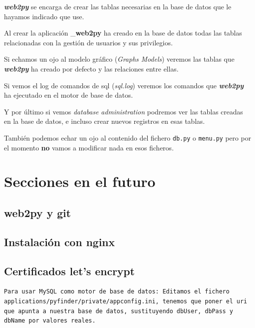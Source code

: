 \documentclass[
  12pt,
  spanish,
]{article}
\begin{document}
\textbf{\emph{web2py}} se encarga de crear las tablas necesarias en la
base de datos que le hayamos indicado que use.

Al crear la aplicación \_\textbf{web2py} ha creado en la base de datos
todas las tablas relacionadas con la gestión de usuarios y sus
privilegios.

Si echamos un ojo al modelo gráfico (\emph{Graphs Models}) veremos las
tablas que \textbf{\emph{web2py}} ha creado por defecto y las relaciones
entre ellas.

Si vemos el log de comandos de sql (\emph{sql.log}) veremos los comandos
que \textbf{\emph{web2py}} ha ejecutado en el motor de base de datos.

Y por último si vemos \emph{database administration} podremos ver las
tablas creadas en la base de datos, e incluso crear nuevos registros en
esas tablas.

También podemos echar un ojo al contenido del fichero \texttt{db.py} o
\texttt{menu.py} pero por el momento \textbf{no} vamos a modificar nada
en esos ficheros.

\hypertarget{secciones-en-el-futuro}{%
\section{Secciones en el futuro}\label{secciones-en-el-futuro}}

\hypertarget{web2py-y-git}{%
\subsection{web2py y git}\label{web2py-y-git}}

\hypertarget{instalaciuxf3n-con-nginx}{%
\subsection{Instalación con nginx}\label{instalaciuxf3n-con-nginx}}

\hypertarget{certificados-lets-encrypt}{%
\subsection{Certificados let's
encrypt}\label{certificados-lets-encrypt}}

\begin{verbatim}
Para usar MySQL como motor de base de datos: Editamos el fichero applications/pyfinder/private/appconfig.ini, tenemos que poner el uri que apunta a nuestra base de datos, sustituyendo dbUser, dbPass y dbName por valores reales.
\end{verbatim}
\end{document}
